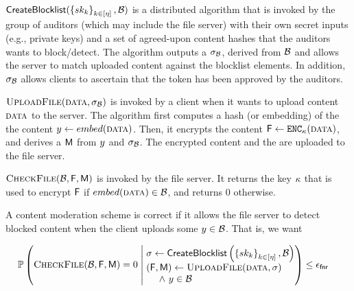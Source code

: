 \enumListStart
	\item \underline{$\createBlocklist(\setOfAuditorPrivkeys, \blocklist)$} 
	 is a distributed algorithm that is invoked by the group of \numAuditors auditors (which may  
	 include the file server) with their own secret inputs (e.g., private keys) and a set of agreed-upon 
	 content hashes \blocklist that the auditors wants to block/detect.
        The algorithm outputs a \blklistToken $\genericSig[\blocklist]$, derived from $\blocklist$ 
        and allows the server to match uploaded content against the blocklist elements. In addition,  
	$\genericSig[\blocklist]$ allows clients to ascertain that the token has been approved by the auditors. 

	\item \underline{$\uploadFile(\clientData, \genericSig[\blocklist])$} is invoked by a client when it 
	wants to upload content $\clientData$ to the server. The algorithm first computes a hash (or embedding) of the the content 
	$\genericCInputElmt \assign \contentHash(\clientData)$. 
	Then, it encrypts the content $\cOutputFile \assign 
	\encrypt[\genericSymmKey](\clientData)$,
	and derives a \contentToken $\cOutputMeta$ from $\genericCInputElmt$ and $\genericSig[\blocklist]$. The encrypted content and the \contentToken are uploaded to the file server. 
	
	\item \underline{$\checkContent(\blocklist,\cOutputFile, \cOutputMeta)$}
          is invoked by the file server.  It returns the key
          $\kappa$ that is used to encrypt $\cOutputFile$
          if $\contentHash(\clientData) \in \blocklist$, and returns 0 otherwise.
\enumListEnd

%
A content moderation scheme is correct if it allows the file server to detect blocked 
content when the client uploads some $\genericCInputElmt \in \blocklist$. That is, we want 

\begin{footnotesize}
	\begin{align*}
	& \cprob{\bigg}{\begin{array}{@{}r@{}}
		\checkContent(\blocklist, \cOutputFile, \cOutputMeta) = 0 
		\end{array}}{\begin{array}[m]{@{}l@{}}
		\genericSig \assign \createBlocklist\left(\setOfAuditorPrivkeys, \blocklist\right) \\
		(\cOutputFile, \cOutputMeta) \assign \uploadFile(\clientData, \genericSig) 
		\\ ~\quad \land ~\genericCInputElmt \in \blocklist
	\end{array}} \le \fnr
\end{align*}
\end{footnotesize}

